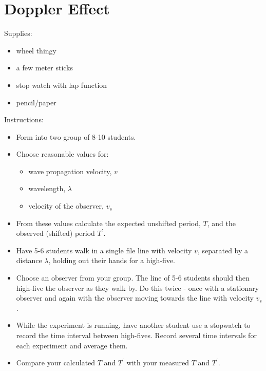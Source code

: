 \section{Doppler Effect}

Supplies:
\begin{itemize}
\item wheel thingy
\item a few meter sticks
\item stop watch with lap function
\item pencil/paper
\end{itemize}

Instructions:
\begin{itemize}
\item Form into two group of 8-10 students.
\item Choose reasonable values for:
\begin{itemize}
\item wave propagation velocity, $v$
\item wavelength, $\lambda$
\item velocity of the observer, $v_s$
\end{itemize}
\item From these values calculate the expected unshifted period, $T$, and the observed (shifted) period $T^\prime$.
\item Have 5-6 students walk in a single file line with velocity $v$, separated by a distance $\lambda$, holding out their hands for a high-five.
\item Choose an observer from your group. The line of 5-6 students should then high-five the observer as they walk by. Do this twice - once with a stationary observer and again with the observer moving towards the line with velocity $v_s$.
\item While the experiment is running, have another student use a stopwatch to record the time interval between high-fives. Record several time intervals for each experiment and average them.
\item Compare your calculated $T$ and $T^\prime$ with your measured $T$ and $T^\prime$.
\end{itemize}

\pagebreak \clearpage
